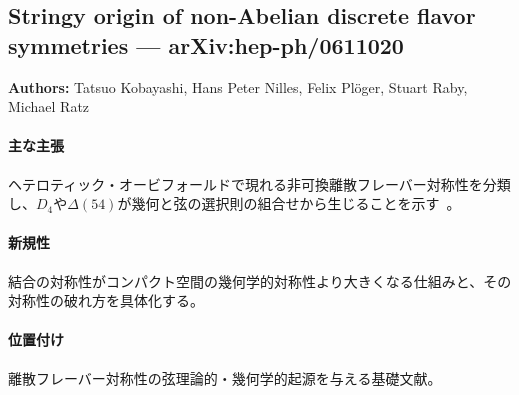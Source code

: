 \subsection{Stringy origin of non-Abelian discrete flavor symmetries --- arXiv:hep-ph/0611020}

\textbf{Authors:} Tatsuo Kobayashi, Hans Peter Nilles, Felix Pl\"oger, Stuart Raby, Michael Ratz

\paragraph{主な主張}
ヘテロティック・オービフォールドで現れる非可換離散フレーバー対称性を分類し、$D_4$や$\Delta(54)$が幾何と弦の選択則の組合せから生じることを示す~\cite{Kobayashi:2006wq}。

\paragraph{新規性}
結合の対称性がコンパクト空間の幾何学的対称性より大きくなる仕組みと、その対称性の破れ方を具体化する。

\paragraph{位置付け}
離散フレーバー対称性の弦理論的・幾何学的起源を与える基礎文献。
